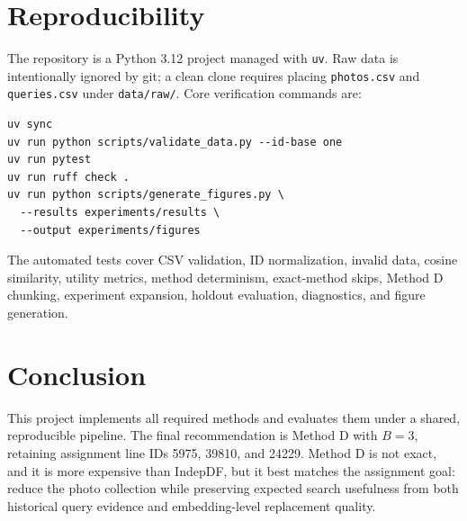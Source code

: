 \documentclass[sigconf,nonacm]{acmart}
\newcommand{\budget}{B}
\begin{document}
\section{Reproducibility}

The repository is a Python 3.12 project managed with \texttt{uv}. Raw data is intentionally ignored by git; a clean clone requires placing \texttt{photos.csv} and \texttt{queries.csv} under \texttt{data/raw/}. Core verification commands are:
\begin{verbatim}
uv sync
uv run python scripts/validate_data.py --id-base one
uv run pytest
uv run ruff check .
uv run python scripts/generate_figures.py \
  --results experiments/results \
  --output experiments/figures
\end{verbatim}
The automated tests cover CSV validation, ID normalization, invalid data, cosine similarity, utility metrics, method determinism, exact-method skips, Method D chunking, experiment expansion, holdout evaluation, diagnostics, and figure generation.

\section{Conclusion}

This project implements all required methods and evaluates them under a shared, reproducible pipeline. The final recommendation is Method D with $\budget=3$, retaining assignment line IDs 5975, 39810, and 24229. Method D is not exact, and it is more expensive than IndepDF, but it best matches the assignment goal: reduce the photo collection while preserving expected search usefulness from both historical query evidence and embedding-level replacement quality.



\end{document}
